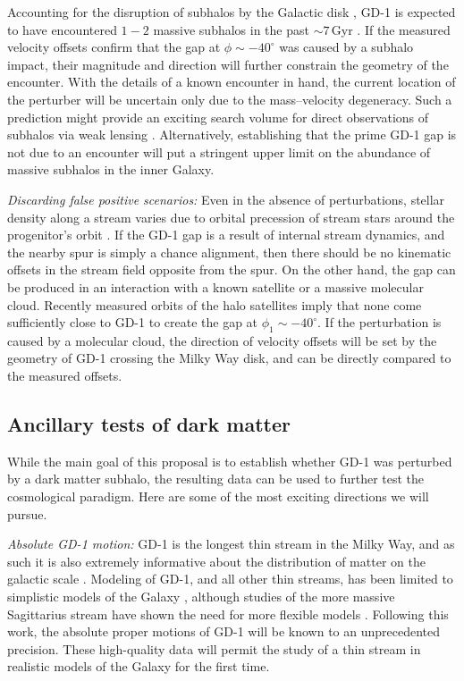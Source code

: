 \documentclass[12pt]{article}
\begin{document}
Accounting for the disruption of subhalos by the Galactic disk \parencite{gk2017}, GD-1 is expected to have encountered $1-2$ massive subhalos in the past $\sim7$\,Gyr \parencite{erkal2016}.
If the measured velocity offsets confirm that the gap at $\phi\sim-40^\circ$ was caused by a subhalo impact, their magnitude and direction will further constrain the geometry of the encounter.
With the details of a known encounter in hand, the current location of the perturber will be uncertain only due to the mass--velocity degeneracy.
Such a prediction might provide an exciting search volume for direct observations of subhalos via weak lensing \parencite{vtilburg2018}.
Alternatively, establishing that the prime GD-1 gap is not due to an encounter will put a stringent upper limit on the abundance of massive subhalos in the inner Galaxy.

\emph{Discarding false positive scenarios:}
Even in the absence of perturbations, stellar density along a stream varies due to orbital precession of stream stars around the progenitor's orbit \parencite[e.g.,][]{kupper2008}.
If the GD-1 gap is a result of internal stream dynamics, and the nearby spur is simply a chance alignment, then there should be no kinematic offsets in the stream field opposite from the spur.
On the other hand, the gap can be produced in an interaction with a known satellite or a massive molecular cloud.
Recently measured orbits of the halo satellites \parencite{helmi2018} imply that none come sufficiently close to GD-1 to create the gap at $\phi_1\sim-40^\circ$.
If the perturbation is caused by a molecular cloud, the direction of velocity offsets will be set by the geometry of GD-1 crossing the Milky Way disk, and can be directly compared to the measured offsets.

\subsection*{Ancillary tests of dark matter}
While the main goal of this proposal is to establish whether GD-1 was perturbed by a dark matter subhalo, the resulting data can be used to further test the cosmological paradigm.
Here are some of the most exciting directions we will pursue.

\emph{Absolute GD-1 motion:}
GD-1 is the longest thin stream in the Milky Way, and as such it is also extremely informative about the distribution of matter on the galactic scale \parencite{bonaca2018}.
Modeling of GD-1, and all other thin streams, has been limited to simplistic models of the Galaxy \parencite[e.g.,][]{koposov2010}, although studies of the more massive Sagittarius stream have shown the need for more flexible models \parencite[e.g.,][]{ibata2013,fardal2018}.
Following this work, the absolute proper motions of GD-1 will be known to an unprecedented precision.
These high-quality data will permit the study of a thin stream in realistic models of the Galaxy for the first time.
\end{document}
